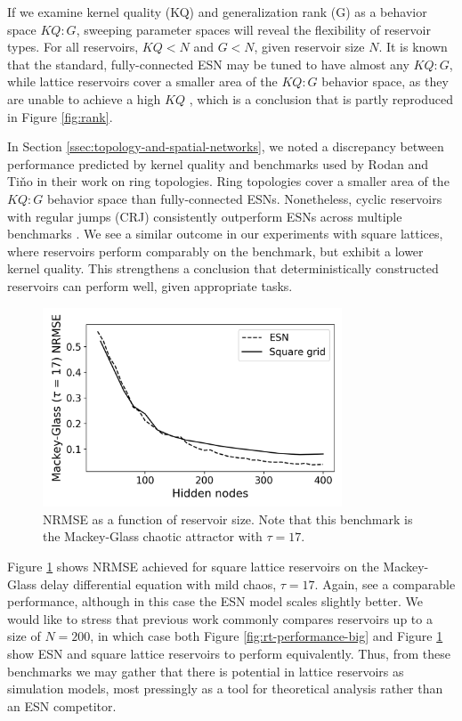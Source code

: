 If we examine kernel quality (KQ) and generalization rank (G) as a behavior
space $KQ:G$, sweeping parameter spaces will reveal the flexibility of reservoir
types. For all reservoirs, $KQ < N$ and $G < N$, given reservoir size $N$. It is
known that the standard, fully-connected ESN may be tuned to have almost any
$KQ:G$, while lattice reservoirs cover a smaller area of the $KQ:G$ behavior
space, as they are unable to achieve a high $KQ$ \cite{mcquillan_role_2019},
which is a conclusion that is partly reproduced in Figure \ref{fig:rank}.

In Section \ref{ssec:topology-and-spatial-networks}, we noted a discrepancy
between performance predicted by kernel quality and benchmarks used by Rodan and
Tiňo in their work on ring topologies. Ring topologies cover a smaller area of
the $KQ:G$ behavior space than fully-connected ESNs. Nonetheless, cyclic
reservoirs with regular jumps (CRJ) consistently outperform ESNs across multiple
benchmarks \cite{rodan_simple_2012}. We see a similar outcome in our experiments
with square lattices, where reservoirs perform comparably on the benchmark, but
exhibit a lower kernel quality. This strengthens a conclusion that
deterministically constructed reservoirs can perform well, given appropriate
tasks.

\begin{figure}[htb]
  \centering
  \includegraphics[width=3.5in]{figures/mg17.png}
  \caption{
    NRMSE as a function of reservoir size. Note that this benchmark is the
Mackey-Glass chaotic attractor with $\tau = 17$.
  }
  \label{fig:mg17}
\end{figure}

Figure \ref{fig:mg17} shows NRMSE achieved for square lattice reservoirs on the
Mackey-Glass delay differential equation with mild chaos, $\tau = 17$. Again,
see a comparable performance, although in this case the ESN model scales
slightly better. We would like to stress that previous work commonly compares
reservoirs up to a size of $N = 200$, in which case both Figure
\ref{fig:rt-performance-big} and Figure \ref{fig:mg17} show ESN and square
lattice reservoirs to perform equivalently. Thus, from these benchmarks we may
gather that there is potential in lattice reservoirs as simulation models, most
pressingly as a tool for theoretical analysis rather than an ESN competitor.

